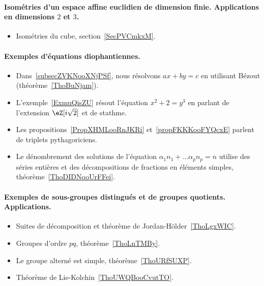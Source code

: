 \paragraph{Isométries d'un espace affine euclidien de dimension finie. Applications en dimensions $2$ et $3$.}
\begin{itemize}
    \item Isométries du cube, section~\ref{SecPVCmkxM}.
\end{itemize}
\paragraph{Exemples d’équations diophantiennes.}
\begin{itemize}
    \item Dans~\ref{subsecZVKNooXNjPSf}, nous résolvons \( ax+by=c\) en utilisant Bézout (théorème~\ref{ThoBuNjam}).
    \item L'exemple~\ref{ExmuQisZU} résout l'équation \( x^2+2=y^3\) en parlant de l'extension \( \eZ[i\sqrt{2}]\) et de stathme.
    \item Les propositions~\ref{PropXHMLooRnJKRi} et~\ref{propFKKKooFYQcxE} parlent de triplets pythagoriciens.
    \item Le dénombrement des solutions de l'équation \( \alpha_1 n_1+\ldots \alpha_pn_p=n\) utilise des séries entières et des décompositions de fractions en éléments simples, théorème~\ref{ThoDIDNooUrFFei}.
\end{itemize}
\paragraph{Exemples de sous-groupes distingués et de groupes quotients. Applications.}
\begin{itemize}
    \item Suites de décomposition et théorème de Jordan-Hölder~\ref{ThoLgxWIC}.
    \item Groupes d'ordre \( pq\), théorème~\ref{ThoLnTMBy}.
    \item Le groupe alterné est simple, théorème~\ref{ThoURfSUXP}.
    \item Théorème de Lie-Kolchin~\ref{ThoUWQBooCvutTO}.
\end{itemize}
